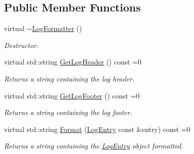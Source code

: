 \subsection*{Public Member Functions}
\begin{DoxyCompactItemize}
\item 
\hypertarget{class_common_1_1_log_formatter_a881b7156070a525a8c48fd24e2843ccd}{virtual \hyperlink{class_common_1_1_log_formatter_a881b7156070a525a8c48fd24e2843ccd}{$\sim$\-Log\-Formatter} ()}\label{class_common_1_1_log_formatter_a881b7156070a525a8c48fd24e2843ccd}

\begin{DoxyCompactList}\small\item\em Destructor. \end{DoxyCompactList}\item 
\hypertarget{class_common_1_1_log_formatter_a41ac9630f001955dd3496a4f74f8a50b}{virtual std\-::string \hyperlink{class_common_1_1_log_formatter_a41ac9630f001955dd3496a4f74f8a50b}{Get\-Log\-Header} () const =0}\label{class_common_1_1_log_formatter_a41ac9630f001955dd3496a4f74f8a50b}

\begin{DoxyCompactList}\small\item\em Returns a string containing the log header. \end{DoxyCompactList}\item 
\hypertarget{class_common_1_1_log_formatter_abb4ac3da1d04937ec42925a2da41a749}{virtual std\-::string \hyperlink{class_common_1_1_log_formatter_abb4ac3da1d04937ec42925a2da41a749}{Get\-Log\-Footer} () const =0}\label{class_common_1_1_log_formatter_abb4ac3da1d04937ec42925a2da41a749}

\begin{DoxyCompactList}\small\item\em Returns a string containing the log footer. \end{DoxyCompactList}\item 
\hypertarget{class_common_1_1_log_formatter_a4e4298a6c1f65b3cf40c757ca705b57d}{virtual std\-::string \hyperlink{class_common_1_1_log_formatter_a4e4298a6c1f65b3cf40c757ca705b57d}{Format} (\hyperlink{class_common_1_1_log_entry}{Log\-Entry} const \&entry) const =0}\label{class_common_1_1_log_formatter_a4e4298a6c1f65b3cf40c757ca705b57d}

\begin{DoxyCompactList}\small\item\em Returns a string containing the \hyperlink{class_common_1_1_log_entry}{Log\-Entry} object formatted. \end{DoxyCompactList}\end{DoxyCompactItemize}


